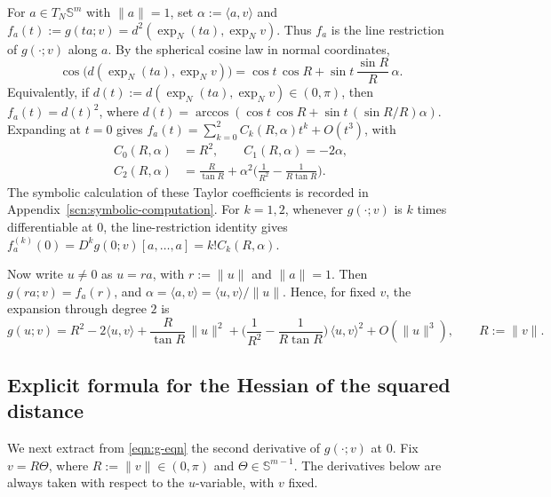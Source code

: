 \documentclass{amsart}
\theoremstyle{definition}
\theoremstyle{remark}
\newcommand\0{\boldsymbol{0}}
\begin{document}
For $a\in T_{N}\mathbb{S}^{m}$ with $\|a\|=1$, set \(\alpha:=\langle a,v\rangle\) and
\(f_{a}(t):=g(ta;v)=d^{2}(\exp_{N}(ta),\exp_{N}v)\).  Thus \(f_a\) is the line restriction of \(g(\cdot;v)\) along \(a\).  By the spherical cosine law in normal coordinates,
\begin{equation}\label{eqn:f_a}
\cos\big(d(\exp_{N}(ta),\exp_{N}v)\big)
=
\cos t\,\cos R
+
\sin t\,\frac{\sin R}{R}\,\alpha.
\end{equation}
Equivalently, if \(d(t):=d(\exp_{N}(ta),\exp_{N}v)\in(0,\pi)\), then
\(f_a(t)=d(t)^2\), where
\(d(t)=\arccos(\cos t\,\cos R+\sin t\,(\sin R/R)\alpha)\).  Expanding at \(t=0\) gives
\(f_a(t)=\sum_{k=0}^{2}C_k(R,\alpha)t^k+O(t^3)\), with
\begin{equation}\label{eqn:C}
\boxed{
\begin{aligned}
C_{0}(R,\alpha)&=R^{2},
\qquad
C_{1}(R,\alpha)=-2\alpha,\\
C_{2}(R,\alpha)&=\frac{R}{\tan R}+\alpha^{2}\Big(\frac{1}{R^{2}}-\frac{1}{R\tan R}\Big).
\end{aligned}
}
\end{equation}
The symbolic calculation of these Taylor coefficients is recorded in Appendix~\ref{scn:symbolic-computation}.  For \(k=1,2\), whenever \(g(\cdot;v)\) is \(k\) times differentiable at \(0\), the line-restriction identity gives
\(f_a^{(k)}(0)=D^kg(0;v)[a,\dots,a]=k!C_k(R,\alpha)\).

Now write \(u\neq 0\) as \(u=ra\), with \(r:=\|u\|\) and \(\|a\|=1\).  Then \(g(ra;v)=f_a(r)\), and \(\alpha=\langle a,v\rangle=\langle u,v\rangle/\|u\|\).  Hence, for fixed \(v\), the expansion through degree \(2\) is
\begin{equation}\label{eqn:g-eqn}
\boxed{
g(u;v)
=
R^{2}
-2\langle u,v\rangle
+
\frac{R}{\tan R}\,\|u\|^{2}
+
\Big(\frac{1}{R^{2}}-\frac{1}{R\tan R}\Big)\,\langle u,v\rangle^{2}
+O(\|u\|^{3}),
\qquad R:=\|v\|.
}
\end{equation}

\subsection{Explicit formula for the Hessian of the squared distance}
\label{subsec:derivatives-g}

We next extract from \eqref{eqn:g-eqn} the second derivative of \(g(\cdot;v)\) at \(0\).  Fix \(v=R\Theta\), where \(R:=\|v\|\in(0,\pi)\) and \(\Theta\in\mathbb{S}^{m-1}\).  The derivatives below are always taken with respect to the \(u\)-variable, with \(v\) fixed.
\end{document}
